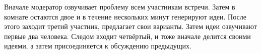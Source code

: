 Вначале модератор озвучивает проблему всем участникам встречи. Затем в комнате остаются двое и в течение нескольких минут генерируют идеи. После этого заходит третий участник, предлагает свои варианты. Затем идеи озвучивают первые два человека. Следом входит четвёртый, и тоже вначале делится своими идеями, а затем присоединяется к обсуждению предыдущих.
